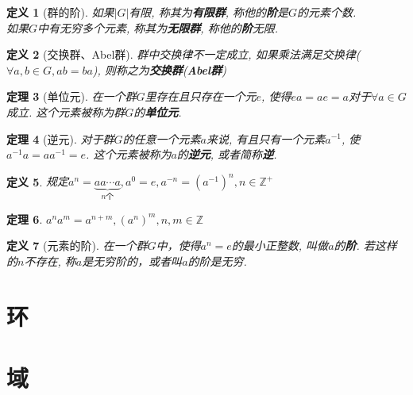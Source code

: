 \documentclass[UTF8]{ctexart}
\newtheorem{Definition}{定义}%
\newtheorem{Theorem}[Definition]{定理}
\begin{document}
\begin{Definition}[群的阶]
如果$|G|$有限, 称其为\textbf{有限群}, 称他的\textbf{阶}是$G$的元素个数. \\
如果$G$中有无穷多个元素, 称其为\textbf{无限群}, 称他的\textbf{阶}无限.
\end{Definition}



\begin{Definition}[交换群、Abel群]
群中交换律不一定成立, 如果乘法满足交换律($\forall a, b \in G, ab = ba$), 则称之为\textbf{交换群}(\textbf{Abel群})
\end{Definition}

\begin{Theorem}[单位元]
在一个群$G$里存在且只存在一个元$e$, 使得$ea = ae = a$对于$\forall a \in G$成立. 这个元素被称为群$G$的\textbf{单位元}.
\end{Theorem}

\begin{Theorem}[逆元]
对于群$G$的任意一个元素$a$来说, 有且只有一个元素$a^{-1}$, 
使 $a^{-1} a = a a^{-1} = e$. 这个元素被称为$a$的\textbf{逆元}, 或者简称\textbf{逆}.
\end{Theorem}

\begin{Definition}
规定$a^n = \underbrace{a a \cdots a}_{n\text{个}}, a^0 = e, a^{-n} = (a^{-1})^n, n \in \mathbb{Z}^{+}$
\end{Definition}

\begin{Theorem}
$ a^n a^m = a^{n+m}, (a^n)^m, n, m \in \mathbb{Z} $
\end{Theorem}

\begin{Definition}[元素的阶]
在一个群$G$中，使得$a^n = e$的最小正整数, 叫做$a$的\textbf{阶}. 若这样的$n$不存在, 称$a$是无穷阶的，或者叫$a$的阶是无穷.
\end{Definition}

\section{环}
\section{域}
\end{document}
